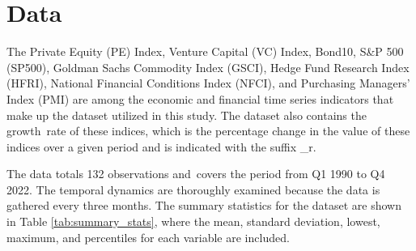 \documentclass[11pt]{article}
\begin{document}
\section{Data}
The Private Equity (PE) Index, Venture Capital (VC) Index, Bond10, S\&P 500 (SP500), Goldman Sachs Commodity Index (GSCI), Hedge Fund Research Index (HFRI), National Financial Conditions Index (NFCI), and Purchasing Managers' Index (PMI) are among the economic and financial time series indicators that make up the dataset utilized in this study. The dataset also contains the growth rate of these indices, which is the percentage change in the value of these indices over a given period and is indicated with the suffix \_r.

The data totals 132 observations and covers the period from Q1 1990 to Q4 2022. The temporal dynamics are thoroughly examined because the data is gathered every three months. The summary statistics for the dataset are shown in Table \ref{tab:summary_stats}, where the mean, standard deviation, lowest, maximum, and percentiles for each variable are included.
\end{document}
